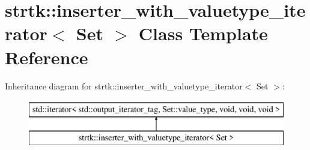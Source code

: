 \hypertarget{classstrtk_1_1inserter__with__valuetype__iterator}{\section{strtk\-:\-:inserter\-\_\-with\-\_\-valuetype\-\_\-iterator$<$ Set $>$ Class Template Reference}
\label{classstrtk_1_1inserter__with__valuetype__iterator}
}
Inheritance diagram for strtk\-:\-:inserter\-\_\-with\-\_\-valuetype\-\_\-iterator$<$ Set $>$\-:\begin{figure}[H]
\begin{center}
\leavevmode
\includegraphics[height=2.000000cm]{classstrtk_1_1inserter__with__valuetype__iterator}
\end{center}
\end{figure}
